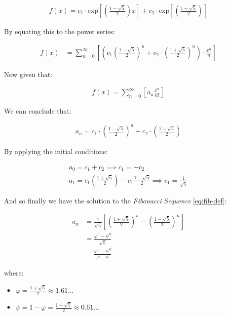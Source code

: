 \documentclass[11pt]{article}
\begin{document}
\begin{align*}
f\left( x \right)= c_1 \cdot  \mathrm{exp}\left[ \left( \frac{1- \sqrt{5} }{2} \right)x \right] +  c_2 \cdot  \mathrm{exp}\left[ \left( \frac{1 +  \sqrt{5} }{2} \right) \right]
\end{align*}


By equating this to the power series:


\begin{align*}
f\left( x \right)&= \sum^{\infty}_{n= 0}   \left[ \left( c_1\left( \frac{1- \sqrt{5} }{2} \right)^n +  c_2 \cdot  \left( \frac{1+ \sqrt{5} }{2} \right)^n \right) \cdot  \frac{x^n}{n} \right]
\end{align*}


Now given that:


\begin{align*}
f\left( x \right)= \sum^{\infty}_{n= 0}   \left[ a_n \frac{x^n}{n!} \right]
\end{align*}


We can conclude that:


\begin{align*}
a_n = c_1\cdot  \left( \frac{1- \sqrt{5} }{2} \right)^n +  c_2 \cdot  \left( \frac{1+  \sqrt{5} }{2} \right)
\end{align*}


By applying the initial conditions:


\begin{align*}
a_0= c_1 +  c_2  \implies  c_1= - c_2\\
a_1= c_1 \left( \frac{1+ \sqrt{5} }{2} \right) -  c_1 \frac{1-\sqrt{5} }{2}  \implies  c_1 = \frac{1}{\sqrt{5} }
\end{align*}


And so finally we have the solution to the \emph{Fibonacci Sequence} \ref{eq:fib-def}:


\begin{align}
    a_n &= \frac{1}{\sqrt{5} } \left[ \left( \frac{1+  \sqrt{5} }{2}  \right)^n -  \left( \frac{1- \sqrt{5} }{2} \right)^n \right] \nonumber \\
&= \frac{\varphi^n - \psi^n}{\sqrt{5} } \nonumber\\
&=\frac{\varphi^n -  \psi^n}{\varphi - \psi} \label{eq:fib-sol}
\end{align}


where:

\begin{itemize}
\item \(\varphi = \frac{1+ \sqrt{5} }{2} \approx 1.61\ldots\)
\item \(\psi = 1-\varphi = \frac{1- \sqrt{5} }{2} \approx 0.61\ldots\)
\end{itemize}
\end{document}
